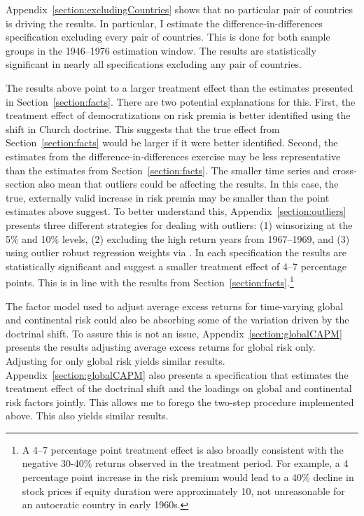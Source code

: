 Appendix~\ref{section:excludingCountries} shows that no particular pair of countries is driving the results. In particular, I estimate the difference-in-differences specification excluding every pair of countries. This is done for both sample groups in the 1946--1976 estimation window. The results are statistically significant in nearly all specifications excluding any pair of countries.

The results above point to a larger treatment effect than the estimates presented in Section~\ref{section:facts}. There are two potential explanations for this. First, the treatment effect of democratizations on risk premia is better identified using the shift in Church doctrine. This suggests that the true effect from Section~\ref{section:facts} would be larger if it were better identified. Second, the estimates from the difference-in-differences exercise may be less representative than the estimates from Section~\ref{section:facts}. The smaller time series and cross-section also mean that outliers could be affecting the results. In this case, the true, externally valid increase in risk premia may be smaller than the point estimates above suggest. To better understand this, Appendix~\ref{section:outliers} presents three different strategies for dealing with outliers: (1) winsorizing at the 5\% and 10\% levels, (2) excluding the high return years from 1967--1969, and (3) using outlier robust regression weights via \cite{Li2006}. In each specification the results are statistically significant and suggest a smaller treatment effect of 4--7 percentage points. This is in line with the results from Section~\ref{section:facts}.\footnote{A 4--7 percentage point treatment effect is also broadly consistent with the negative 30-40\% returns observed in the treatment period. For example, a 4 percentage point increase in the risk premium would lead to a 40\% decline in stock prices if equity duration were approximately 10, not unreasonable for an autocratic country in early 1960s.}

The factor model used to adjust average excess returns for time-varying global and continental risk could also be absorbing some of the variation driven by the doctrinal shift. To assure this is not an issue, Appendix~\ref{section:globalCAPM} presents the results adjusting average excess returns for global risk only. Adjusting for only global risk yields similar results. Appendix~\ref{section:globalCAPM} also presents a specification that estimates the treatment effect of the doctrinal shift and the loadings on global and continental risk factors jointly. This allows me to forego the two-step procedure implemented above. This also yields similar results.  

